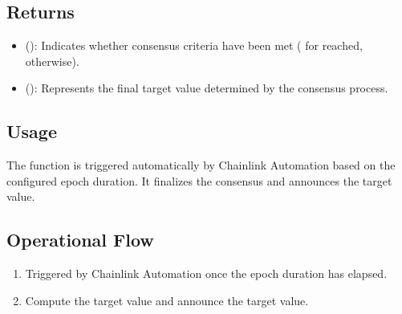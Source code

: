 \documentclass[letterpaper,10pt,english]{sphinxmanual}
\begin{document}
\begin{sphinxVerbatim}[commandchars=\\\{\}]
\end{sphinxVerbatim}


\subsection{Returns}
\label{\detokenize{docs_consensus_mechanism_contract:returns}}\begin{itemize}
\item {} 
\sphinxAtStartPar
{} ():
Indicates whether consensus criteria have been met ( for reached,  otherwise).

\item {} 
\sphinxAtStartPar
{} ():
Represents the final target value determined by the consensus process.

\end{itemize}


\subsection{Usage}
\label{\detokenize{docs_consensus_mechanism_contract:id4}}
\sphinxAtStartPar
The function is triggered automatically by Chainlink Automation based on the configured epoch duration. It finalizes the consensus and announces the target value.


\subsection{Operational Flow}
\label{\detokenize{docs_consensus_mechanism_contract:id5}}\begin{enumerate}
%
\item {} 
\sphinxAtStartPar
{} Triggered by Chainlink Automation once the epoch duration has elapsed.

\item {} 
\sphinxAtStartPar
{} Compute the target value and announce the target value.

\end{enumerate}
\end{document}
